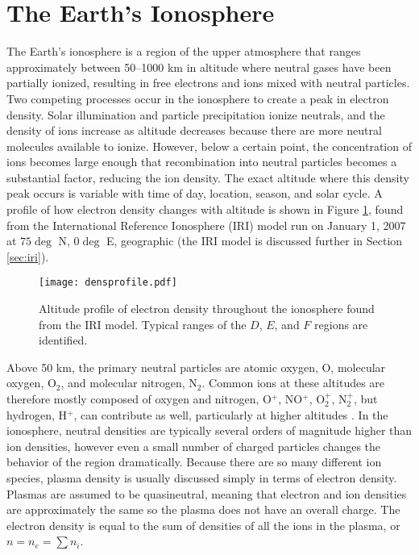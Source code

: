 \section{The Earth's Ionosphere}
\label{sec:ionosphere}
The Earth's ionosphere is a region of the upper atmosphere that ranges approximately between 50--1000 km in altitude where neutral gases have been partially ionized, resulting in free electrons and ions mixed with neutral particles.  Two competing processes occur in the ionosphere to create a peak in electron density.  Solar illumination and particle precipitation ionize neutrals, and the density of ions increase as altitude decreases because there are more neutral molecules available to ionize.  However, below a certain point, the concentration of ions becomes large enough that recombination into neutral particles becomes a substantial factor, reducing the ion density.  The exact altitude where this density peak occurs is variable with time of day, location, season, and solar cycle.  A profile of how electron density changes with altitude is shown in Figure \ref{fig:densprofile}, found from the International Reference Ionosphere (IRI) model run on January 1, 2007 at \(75\deg\) N, \(0\deg\) E, geographic (the IRI model is discussed further in Section \ref{sec:iri}).

\begin{figure}
	\texttt{[image: densprofile.pdf]}
	\caption[Ionosphere density profile]{Altitude profile of electron density throughout the ionosphere found from the IRI model.  Typical ranges of the \(D\), \(E\), and \(F\) regions are identified.}
	\label{fig:densprofile}
\end{figure}

Above 50 km, the primary neutral particles are atomic oxygen, O, molecular oxygen, O\(_2\), and molecular nitrogen, N\(_2\).  Common ions at these altitudes are therefore mostly composed of oxygen and nitrogen, O\(^+\), NO\(^+\), O\(_2^+\), N\(_2^+\), but hydrogen, H\(^+\), can contribute as well, particularly at higher altitudes \citep{Kelley2009}.  In the ionosphere, neutral densities are typically several orders of magnitude higher than ion densities, however even a small number of charged particles changes the behavior of the region dramatically.  Because there are so many different ion species, plasma density is usually discussed simply in terms of electron density.  Plasmas are assumed to be quasineutral, meaning that electron and ion densities are approximately the same so the plasma does not have an overall charge.  The electron density is equal to the sum of densities of all the ions in the plasma, or \(n = n_e = \sum n_i\).

